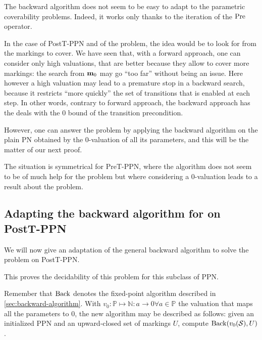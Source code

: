 The backward algorithm does not seem to be easy to adapt to the parametric coverability problems.
Indeed, it works only thanks to the iteration of the $\operatorname{Pre}$ operator.

In the case of PostT-\ac{PPN} and of the \Ecov problem, the idea would be to look for \mari from the markings to cover.
We have seen that, with a forward approach, one can consider only high valuations, that are better because they allow to cover more markings: the search from $\mathbf{m}_0$ may go ``too far'' without being an issue.
Here however a high valuation may lead to a premature stop in a backward search, because it restricts ``more quickly'' the set of transitions that is enabled at each step.
In other words, contrary to forward approach, the backward approach has the deals with the 0 bound of the transition precondition. 

However, one can answer the \Ucov problem by applying the backward algorithm on the plain \ac{PN} obtained by the 0-valuation of all its parameters, and this will be the matter of our next proof.

The situation is symmetrical for PreT-\ac{PPN}, where the algorithm does not seem to be of much help for the \Ucov problem but where considering a 0-valuation leads to a result about the \Ecov problem.

\subsection{Adapting the backward algorithm for \Ucov on PostT-\ac{PPN}}

We will now give an adaptation of the general backward algorithm to solve the \Ucov problem on PostT-\ac{PPN}.

This proves the decidability of this problem for this subclass of \ac{PPN}.

Remember that $\operatorname{Back}$ denotes the fixed-point algorithm described in \autoref{sec:backward-algorithm}.
With $v_0 : \mathbb{P} \mapsto \mathbb{N} : a \rightarrow 0 \forall a \in \mathbb{P}$ the valuation that maps all the parameters to 0, the new algorithm may be described as follows:
given an initialized \ac{PPN} \SPTPm and an upward-closed set of markings $U$, compute $\operatorname{Back}(v_0(\mathcal{S}), U)$.

